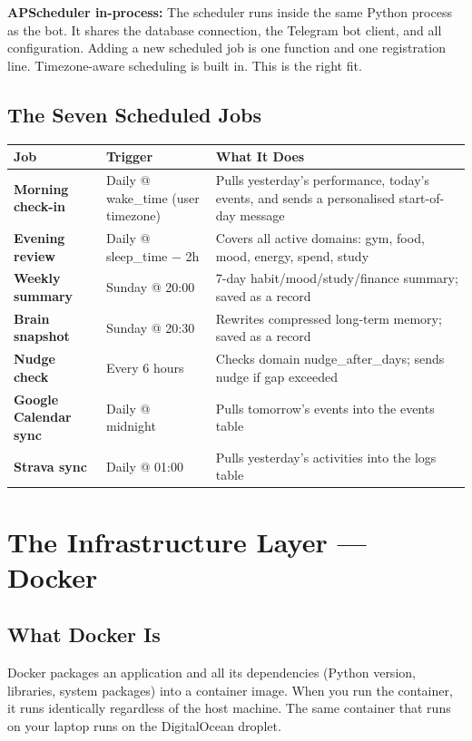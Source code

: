\documentclass[12pt, a4paper]{article}
\begin{document}
\textbf{APScheduler in-process:} The scheduler runs inside the same Python process as the bot. It shares the database connection, the Telegram bot client, and all configuration. Adding a new scheduled job is one function and one registration line. Timezone-aware scheduling is built in. This is the right fit.

\subsection{The Seven Scheduled Jobs}

\begin{longtable}{>{\bfseries}p{4cm} p{3cm} p{7cm}}
\toprule
Job & Trigger & What It Does \\
\midrule
Morning check-in & Daily @ wake\_time (user timezone) & Pulls yesterday's performance, today's events, and sends a personalised start-of-day message \\
\addlinespace
Evening review & Daily @ sleep\_time $-$ 2h & Covers all active domains: gym, food, mood, energy, spend, study \\
\addlinespace
Weekly summary & Sunday @ 20:00 & 7-day habit/mood/study/finance summary; saved as a record \\
\addlinespace
Brain snapshot & Sunday @ 20:30 & Rewrites compressed long-term memory; saved as a record \\
\addlinespace
Nudge check & Every 6 hours & Checks domain nudge\_after\_days; sends nudge if gap exceeded \\
\addlinespace
Google Calendar sync & Daily @ midnight & Pulls tomorrow's events into the events table \\
\addlinespace
Strava sync & Daily @ 01:00 & Pulls yesterday's activities into the logs table \\
\bottomrule
\end{longtable}

\section{The Infrastructure Layer --- Docker}

\subsection{What Docker Is}

Docker packages an application and all its dependencies (Python version, libraries, system packages) into a container image. When you run the container, it runs identically regardless of the host machine. The same container that runs on your laptop runs on the DigitalOcean droplet.
\end{document}
